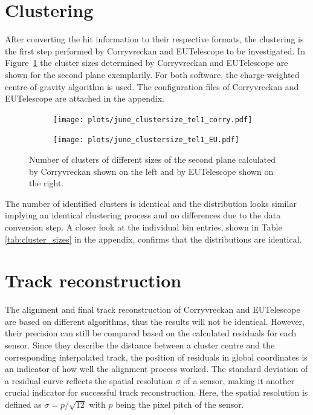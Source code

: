 \section{Clustering}
After converting the hit information to their respective formats, the clustering is the first step performed by Corryvreckan and EUTelescope
to be investigated.
In \mbox{Figure \ref{fig:cluster_size}} the cluster sizes determined by Corryvreckan and EUTelescope are shown for the second plane exemplarily.
For both software, the charge-weighted centre-of-gravity algorithm is used. The configuration files of Corryvreckan and EUTelescope are attached in the appendix.

\begin{figure}
  \hspace{-0.4cm}
  \begin{subfigure}{0.51\textwidth}
      \texttt{[image: plots/june\_clustersize\_tel1\_corry.pdf]}
  \end{subfigure}
  \begin{subfigure}{0.51\textwidth}
      \hspace{-0.19cm}
      \texttt{[image: plots/june\_clustersize\_tel1\_EU.pdf]}
  \end{subfigure}
  \caption{Number of clusters of different sizes of the second plane calculated by Corryvreckan shown on the left and by EUTelescope shown on the right.}
  \label{fig:cluster_size}
\end{figure}

The number of identified clusters is identical and the distribution looks similar implying an identical clustering process
and no differences due to the data conversion step. A closer look at the individual bin entries, shown in Table \ref{tab:cluster_sizes} in the appendix,
confirms that the distributions are identical.

\section{Track reconstruction}
The alignment and final track reconstruction of Corryvreckan and EUTelescope are based on different algorithms, thus the
results will not be identical. However, their precision can still be compared based on the calculated residuals for each sensor.
Since they describe the distance between a cluster centre and the corresponding interpolated track, the position of
residuals in global coordinates is an indicator of how well the alignment process worked. The standard deviation of a
residual curve reflects the spatial resolution $\sigma$ of a sensor, making it another crucial indicator
for successful track reconstruction. Here, the spatial resolution is defined as ${\sigma = p/\sqrt{12}}$ with $p$ being the
pixel pitch of the sensor.

